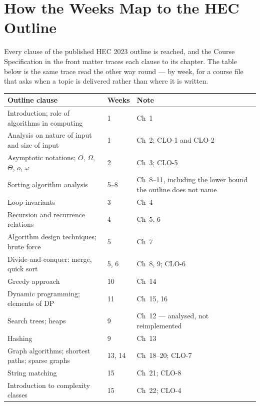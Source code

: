 \section{How the Weeks Map to the HEC Outline}

Every clause of the published HEC 2023 outline is reached, and the Course
Specification in the front matter traces each clause to its chapter. The table
below is the same trace read the other way round --- by week, for a course file
that asks when a topic is delivered rather than where it is written.

\begin{longtable}{@{}L{4.0cm}L{3.0cm}L{7.4cm}@{}}
\toprule
{}
\textbf{Outline clause} & \textbf{Weeks} & \textbf{Note} \\
\midrule
\endhead
Introduction; role of algorithms in computing & 1 & Ch~1 \\
Analysis on nature of input and size of input & 1 & Ch~2; CLO-1 and CLO-2 \\
Asymptotic notations; $O$, $\Omega$, $\Theta$, $o$, $\omega$ & 2 & Ch~3;
  CLO-5 \\
Sorting algorithm analysis & 5--8 & Ch~8--11, including the lower bound the
  outline does not name \\
Loop invariants & 3 & Ch~4 \\
Recursion and recurrence relations & 4 & Ch~5, 6 \\
Algorithm design techniques; brute force & 5 & Ch~7 \\
Divide-and-conquer; merge, quick sort & 5, 6 & Ch~8, 9; CLO-6 \\
Greedy approach & 10 & Ch~14 \\
Dynamic programming; elements of DP & 11 & Ch~15, 16 \\
Search trees; heaps & 9 & Ch~12 --- analysed, not reimplemented \\
Hashing & 9 & Ch~13 \\
Graph algorithms; shortest paths; sparse graphs & 13, 14 & Ch~18--20; CLO-7 \\
String matching & 15 & Ch~21; CLO-8 \\
Introduction to complexity classes & 15 & Ch~22; CLO-4 \\
\bottomrule
\end{longtable}

